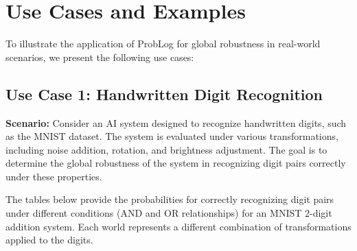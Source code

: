 \section{Use Cases and Examples}

To illustrate the application of ProbLog for global robustness in real-world scenarios, we present the following use cases:

\subsection{Use Case 1: Handwritten Digit Recognition}

\textbf{Scenario:} Consider an AI system designed to recognize handwritten digits, such as the MNIST dataset. The system is evaluated under various transformations, including noise addition, rotation, and brightness adjustment. The goal is to determine the global robustness of the system in recognizing digit pairs correctly under these properties.

The tables below provide the probabilities for correctly recognizing digit pairs under different conditions (AND and OR relationships) for an MNIST 2-digit addition system. Each world represents a different combination of transformations applied to the digits.

